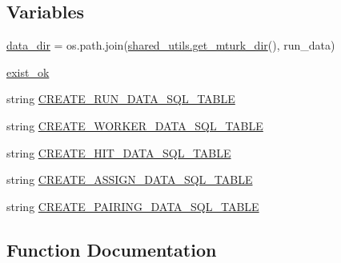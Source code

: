 \subsection*{Variables}
\begin{DoxyCompactItemize}
\item 
\hyperlink{namespaceparlai_1_1mturk_1_1core_1_1legacy__2018_1_1mturk__data__handler_a2093ff07b061a11efdf73e5ad733dadf}{data\+\_\+dir} = os.\+path.\+join(\hyperlink{namespaceparlai_1_1mturk_1_1core_1_1legacy__2018_1_1shared__utils_ad4874994d87b965b1bc462e1d55aadd3}{shared\+\_\+utils.\+get\+\_\+mturk\+\_\+dir}(), \textquotesingle{}run\+\_\+data\textquotesingle{})
\item 
\hyperlink{namespaceparlai_1_1mturk_1_1core_1_1legacy__2018_1_1mturk__data__handler_a2fa3f718c63f7e829a1f715971ffe2c7}{exist\+\_\+ok}
\item 
string \hyperlink{namespaceparlai_1_1mturk_1_1core_1_1legacy__2018_1_1mturk__data__handler_aeb74121e51799249138091bde9fb07db}{C\+R\+E\+A\+T\+E\+\_\+\+R\+U\+N\+\_\+\+D\+A\+T\+A\+\_\+\+S\+Q\+L\+\_\+\+T\+A\+B\+LE}
\item 
string \hyperlink{namespaceparlai_1_1mturk_1_1core_1_1legacy__2018_1_1mturk__data__handler_aeb2918b96d3c8f22fccf25188fa2db7f}{C\+R\+E\+A\+T\+E\+\_\+\+W\+O\+R\+K\+E\+R\+\_\+\+D\+A\+T\+A\+\_\+\+S\+Q\+L\+\_\+\+T\+A\+B\+LE}
\item 
string \hyperlink{namespaceparlai_1_1mturk_1_1core_1_1legacy__2018_1_1mturk__data__handler_ac5bfadfe5e832bc603c3449606b02fff}{C\+R\+E\+A\+T\+E\+\_\+\+H\+I\+T\+\_\+\+D\+A\+T\+A\+\_\+\+S\+Q\+L\+\_\+\+T\+A\+B\+LE}
\item 
string \hyperlink{namespaceparlai_1_1mturk_1_1core_1_1legacy__2018_1_1mturk__data__handler_a121789130aa54c4d2b065f195ff83466}{C\+R\+E\+A\+T\+E\+\_\+\+A\+S\+S\+I\+G\+N\+\_\+\+D\+A\+T\+A\+\_\+\+S\+Q\+L\+\_\+\+T\+A\+B\+LE}
\item 
string \hyperlink{namespaceparlai_1_1mturk_1_1core_1_1legacy__2018_1_1mturk__data__handler_a010d52d8ac8e5fbaf2decaa333c8f360}{C\+R\+E\+A\+T\+E\+\_\+\+P\+A\+I\+R\+I\+N\+G\+\_\+\+D\+A\+T\+A\+\_\+\+S\+Q\+L\+\_\+\+T\+A\+B\+LE}
\end{DoxyCompactItemize}


\subsection{Function Documentation}
\mbox{\label{namespaceparlai_1_1mturk_1_1core_1_1legacy__2018_1_1mturk__data__handler_af046a82aca024a0c9a5e1b30a10fd921}} 
